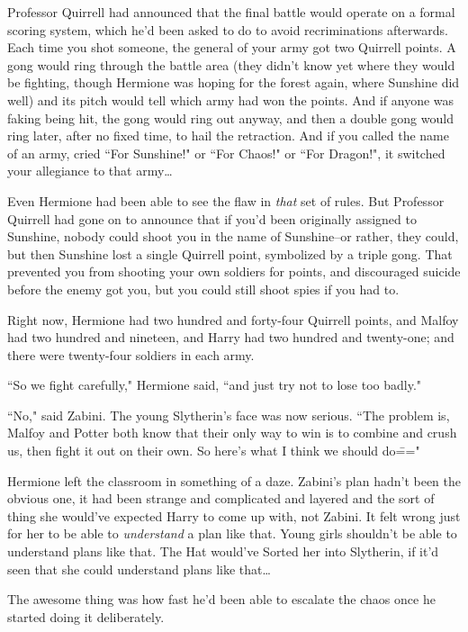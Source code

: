 Professor Quirrell had announced that the final battle would operate on a formal scoring system, which he'd been asked to do to avoid recriminations afterwards. Each time you shot someone, the general of your army got two Quirrell points. A gong would ring through the battle area (they didn't know yet where they would be fighting, though Hermione was hoping for the forest again, where Sunshine did well) and its pitch would tell which army had won the points. And if anyone was faking being hit, the gong would ring out anyway, and then a double gong would ring later, after no fixed time, to hail the retraction. And if you called the name of an army, cried ``For Sunshine!" or ``For Chaos!" or ``For Dragon!", it switched your allegiance to that army{\ldots}

Even Hermione had been able to see the flaw in \emph{that} set of rules. But Professor Quirrell had gone on to announce that if you'd been originally assigned to Sunshine, nobody could shoot you in the name of Sunshine\---or rather, they could, but then Sunshine lost a single Quirrell point, symbolized by a triple gong. That prevented you from shooting your own soldiers for points, and discouraged suicide before the enemy got you, but you could still shoot spies if you had to.

Right now, Hermione had two hundred and forty-four Quirrell points, and Malfoy had two hundred and nineteen, and Harry had two hundred and twenty-one; and there were twenty-four soldiers in each army.

``So we fight carefully," Hermione said, ``and just try not to lose too badly."

``No," said Zabini. The young Slytherin's face was now serious. ``The problem is, Malfoy and Potter both know that their only way to win is to combine and crush us, then fight it out on their own. So here's what I think we should do\==="

Hermione left the classroom in something of a daze. Zabini's plan hadn't been the obvious one, it had been strange and complicated and layered and the sort of thing she would've expected Harry to come up with, not Zabini. It felt wrong just for her to be able to \emph{understand} a plan like that. Young girls shouldn't be able to understand plans like that. The Hat would've Sorted her into Slytherin, if it'd seen that she could understand plans like that{\ldots}

\later

The awesome thing was how fast he'd been able to escalate the chaos once he started doing it deliberately.

